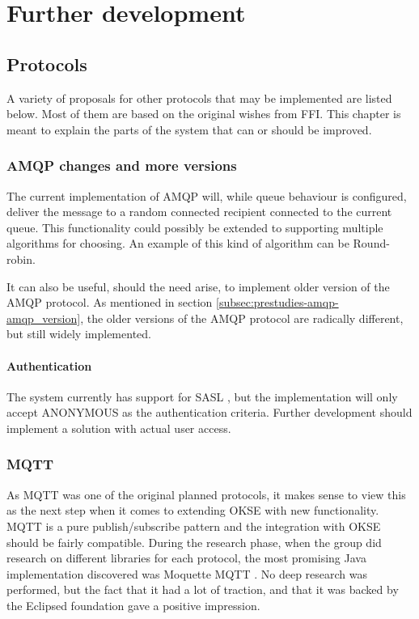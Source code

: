 
\chapter{Further development}

\section{Protocols}
A variety of proposals for other protocols that may be implemented are listed below. Most of them are based on the original wishes from FFI. This chapter is meant to explain the parts of the system that can or should be improved. 

\subsection{AMQP changes and more versions}
The current implementation of AMQP will, while queue behaviour is configured, deliver the message to a random connected recipient connected to the current queue. This functionality could possibly be extended to supporting multiple algorithms for choosing. An example of this kind of algorithm can be Round-robin.

It can also be useful, should the need arise, to implement older version of the AMQP protocol. As mentioned in section \ref{subsec:prestudies-amqp-amqp_version}, the older versions of the AMQP protocol are radically different, but still widely implemented.

\subsubsection{Authentication}
The system currently has support for SASL \cite{sasl}, but the implementation will only accept ANONYMOUS as the authentication criteria. Further development should implement a solution with actual user access. 

\subsection{MQTT}
As MQTT was one of the original planned protocols, it makes sense to view this as the next step when it comes to extending OKSE with new functionality. MQTT is a pure publish/subscribe pattern and the integration with OKSE should be fairly compatible. 
During the research phase, when the group did research on different libraries for each protocol, the most promising Java implementation discovered was Moquette MQTT \cite{moquette-mqtt}. No deep research was performed, but the fact that it had a lot of traction, and that it was backed by the Eclipsed foundation gave a positive impression.

